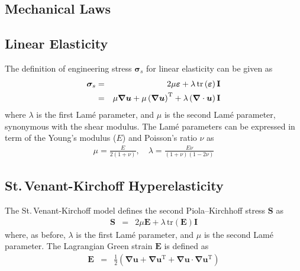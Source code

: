 \documentclass[sn-mathphys,Numbered]{sn-jnl}%
\newcommand{\bb}{\boldsymbol}
\begin{document}
\begin{appendices}
%
%
\section{Mechanical Laws}
\label{app:mechLaws}
%
%
\subsection{Linear Elasticity}
The definition of engineering stress $\bb{\sigma}_s$ for linear elasticity can be given as
\begin{eqnarray}  \label{eq:linearElastic}
	\bb{\sigma}_s
	&=& 2 \mu \bb{\varepsilon} + \lambda \, \text{tr} \left( \bb{\varepsilon} \right) \textbf{I} \notag \\
	&=& \mu \bb{\nabla} \bb{u} + \mu \left( \bb{\nabla} \bb{u}\right)^{\text{T}} + \lambda \left(\bb{\nabla} \cdot \bb{u} \right) \textbf{I}
\end{eqnarray}
where $\lambda$ is the first Lam\'{e} parameter, and $\mu$ is the second Lam\'{e} parameter, synonymous with the shear modulus.
The Lam\'{e} parameters can be expressed in term of the Young's modulus ($E$) and Poisson's ratio $\nu$ as
\begin{eqnarray}
	\mu = \frac{E}{2(1 + \nu)}, \quad \lambda = \frac{E \nu}{(1+\nu)(1 - 2\nu)}
\end{eqnarray}
%
\subsection{St.\,Venant-Kirchoff Hyperelasticity}
%
The St.\,Venant-Kirchoff model defines the second Piola–Kirchhoff stress $\textbf{S}$ as
\begin{eqnarray}
	\bb{S} &=& 2 \mu \bb{E} + \lambda \, \text{tr} \left( \bb{E} \right) \textbf{I}
\end{eqnarray}
where, as before, $\lambda$ is the first Lam\'{e} parameter, and $\mu$ is the second Lam\'{e} parameter.
The Lagrangian Green strain $\textbf{E}$ is defined as
\begin{eqnarray}
	\bb{E} &=& \frac{1}{2} \left( \bb{\nabla} \bb{u} + \bb{\nabla} \bb{u}^{\text{T}} + \bb{\nabla} \bb{u} \cdot \bb{\nabla} \bb{u}^{\text{T}}  \right)
\end{eqnarray}


\end{appendices}
\end{document}

